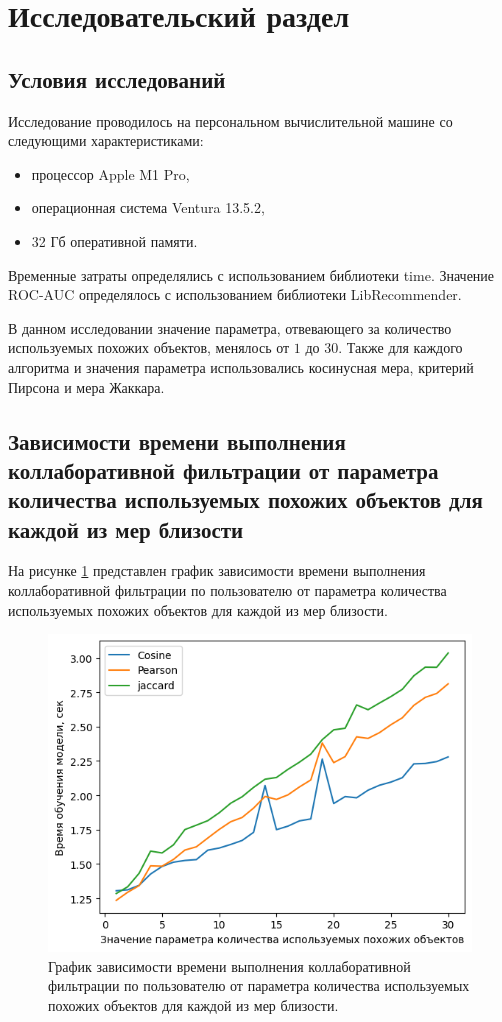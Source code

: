 \section{Исследовательский раздел}
\subsection{Условия исследований}
Исследование проводилось на персональном вычислительной машине со следующими характеристиками:

\begin{itemize}
\item процессор Apple M1 Pro,
\item операционная система Ventura 13.5.2,
\item 32 Гб оперативной памяти.
\end{itemize}

Временные затраты определялись с использованием библиотеки time. Значение ROC-AUC определялось с использованием библиотеки LibRecommender.

В данном исследовании значение параметра, отвевающего за количество используемых похожих объектов, менялось от $1$ до $30$. Также для каждого алгоритма и значения параметра использовались косинусная мера, критерий Пирсона и мера Жаккара.

\subsection{Зависимости времени выполнения коллаборативной фильтрации от параметра количества используемых похожих объектов для каждой из мер близости}

На рисунке \ref{img:time1} представлен график зависимости времени выполнения коллаборативной фильтрации по пользователю от параметра количества используемых похожих объектов для каждой из мер близости.

\begin{figure}[H]
	\centering
	\includegraphics[width=\textwidth]{inc/timesUser.png}
	\caption{ График зависимости времени выполнения коллаборативной фильтрации по пользователю от параметра количества используемых похожих объектов для каждой из мер близости.}
	\label{img:time1}
\end{figure}

